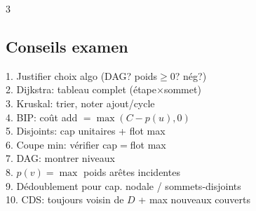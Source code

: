\documentclass[a4paper,4pt]{article}
\begin{document}
\begin{multicols}{3}
\subsection{Conseils examen}
1. Justifier choix algo (DAG? poids$\geq0$? n\'eg?)\\
2. Dijkstra: tableau complet (\'etape$\times$sommet)\\
3. Kruskal: trier, noter ajout/cycle\\
4. BIP: co\^ut add $=\max(C-p(u),0)$\\
5. Disjoints: cap unitaires + flot max\\
6. Coupe min: v\'erifier cap$=$flot max\\
7. DAG: montrer niveaux\\
8. $p(v)=\max$ poids ar\^etes incidentes\\
9. D\'edoublement pour cap. nodale / sommets-disjoints\\
10. CDS: toujours voisin de $D$ + max nouveaux couverts

\end{multicols}
\end{document}
